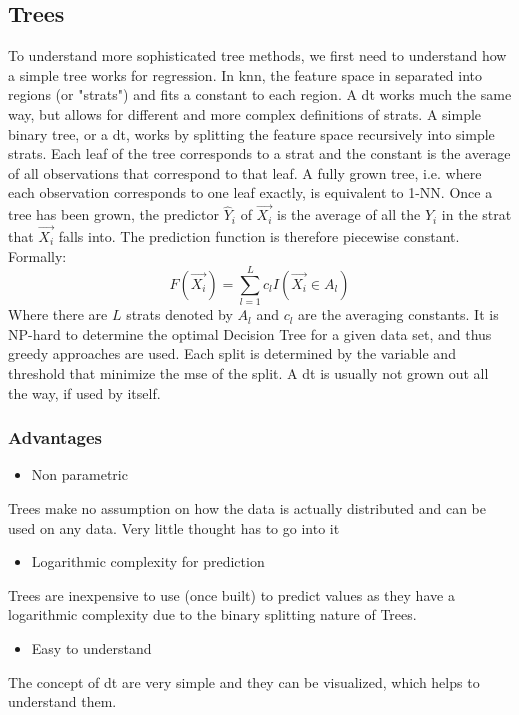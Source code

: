 \subsection{Trees}
To understand more sophisticated tree methods, we first need to understand how a simple tree works for regression. In \acrshort{knn}, the feature space in separated into regions (or "strats") and fits a constant to each region. A \acrfull{dt} \cite{DTpaper} works much the same way, but allows for different and more complex definitions of strats.
A simple binary tree, or a \acrshort{dt}, works by splitting the feature space recursively into simple strats. Each leaf of the tree corresponds to a strat and the constant is the average of all observations that correspond to that leaf. A fully grown tree, i.e. where each observation corresponds to one leaf exactly, is equivalent to 1-NN.
 Once a tree has been grown, the predictor $\hat{Y}_i$ of $\vec{X_i}$ is the average of all the $Y_i$ in the strat that $\vec{X_i}$ falls into. The prediction function is therefore piecewise constant.
Formally:
$$
F(\vec{X_i}) = \sum_{l=1}^L c_l I(\vec{X_i} \in A_l)
$$
Where there are $L$ strats denoted by $A_l$ and $c_l$ are the averaging constants.
It is NP-hard to determine the optimal Decision Tree for a given data set, and thus greedy approaches are used. Each split is determined by the variable and threshold that minimize the \acrlong{mse} of the split. A \acrshort{dt} is usually not grown out all the way, if used by itself.

\subsubsection{Advantages}
\begin{itemize}
\item Non parametric
\end{itemize}
Trees make no assumption on how the data is actually distributed and can be used on any data. Very little thought has to go into it
\begin{itemize}
\item Logarithmic complexity for prediction
\end{itemize}
Trees are inexpensive to use (once built) to predict values as they have a logarithmic complexity due to the binary splitting nature of Trees.
\begin{itemize}
\item Easy to understand
\end{itemize}
The concept of \acrlong{dt} are very simple and they can be visualized, which helps to understand them.
